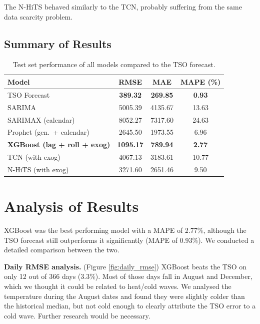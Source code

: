 \documentclass[11pt,a4paper]{article}
\begin{document}
The N-HiTS behaved similarly to the TCN, probably suffering from the same data scarcity problem.

\subsection{Summary of Results}

\begin{table}[H]
\centering
\caption{Test set performance of all models compared to the TSO forecast.}
\label{tab:results}
\begin{tabular}{lccc}
\toprule
\textbf{Model} & \textbf{RMSE} & \textbf{MAE} & \textbf{MAPE (\%)} \\
\midrule
TSO Forecast & \textbf{389.32} & \textbf{269.85} & \textbf{0.93} \\
\midrule
SARIMA & 5005.39 & 4135.67 & 13.63 \\
SARIMAX (calendar) & 8052.27 & 7317.60 & 24.63 \\
Prophet (gen.\ + calendar) & 2645.50 & 1973.55 & 6.96 \\
\textbf{XGBoost (lag + roll + exog)} & \textbf{1095.17} & \textbf{789.94} & \textbf{2.77} \\
TCN (with exog) & 4067.13 & 3183.61 & 10.77 \\
N-HiTS (with exog) & 3271.60 & 2651.46 & 9.50 \\
\bottomrule
\end{tabular}
\end{table}

\section{Analysis of Results}

XGBoost was the best performing model with a MAPE of 2.77\%, although the TSO forecast still outperforms it significantly (MAPE of 0.93\%). We conducted a detailed comparison between the two.

\textbf{Daily RMSE analysis.} (Figure \ref{fig:daily_rmse}) XGBoost beats the TSO on only 12 out of 366 days (3.3\%). Most of those days fall in August and December, which we thought it could be related to heat/cold waves. We analysed the temperature during the August dates and found they were slightly colder than the historical median, but not cold enough to clearly attribute the TSO error to a cold wave. Further research would be necessary.
\end{document}
